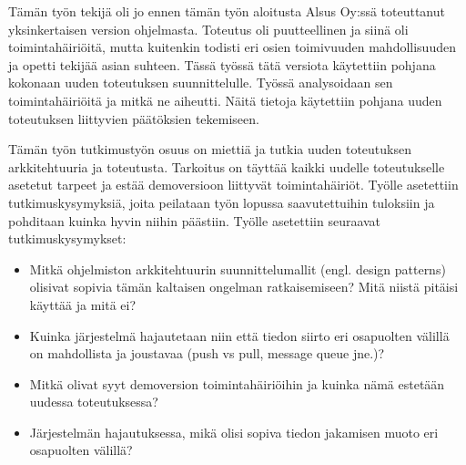 Tämän työn tekijä oli jo ennen tämän työn aloitusta Alsus Oy:ssä toteuttanut yksinkertaisen version ohjelmasta. Toteutus oli puutteellinen ja siinä oli toimintahäiriöitä, mutta kuitenkin todisti eri osien toimivuuden mahdollisuuden ja opetti tekijää asian suhteen. Tässä työssä tätä versiota käytettiin pohjana kokonaan uuden toteutuksen suunnittelulle. Työssä analysoidaan sen toimintahäiriöitä ja mitkä ne aiheutti. Näitä tietoja käytettiin pohjana uuden toteutuksen liittyvien päätöksien tekemiseen.

Tämän työn tutkimustyön osuus on miettiä ja tutkia uuden toteutuksen arkkitehtuuria ja toteutusta. Tarkoitus on täyttää kaikki uudelle toteutukselle asetetut tarpeet ja estää demoversioon liittyvät toimintahäiriöt. Työlle asetettiin tutkimuskysymyksiä, joita peilataan työn lopussa saavutettuihin tuloksiin ja pohditaan kuinka hyvin niihin päästiin. Työlle asetettiin seuraavat tutkimuskysymykset:
\begin{itemize}
	\item Mitkä ohjelmiston arkkitehtuurin suunnittelumallit (engl. design patterns) olisivat sopivia tämän kaltaisen ongelman ratkaisemiseen? Mitä niistä pitäisi käyttää ja mitä ei?
	\item Kuinka järjestelmä hajautetaan niin että tiedon siirto eri osapuolten välillä on mahdollista ja joustavaa (push vs pull, message queue jne.)?
	\item Mitkä olivat syyt demoversion toimintahäiriöihin ja kuinka nämä estetään uudessa toteutuksessa?
	\item Järjestelmän hajautuksessa, mikä olisi sopiva tiedon jakamisen muoto eri osapuolten välillä?
\end{itemize}